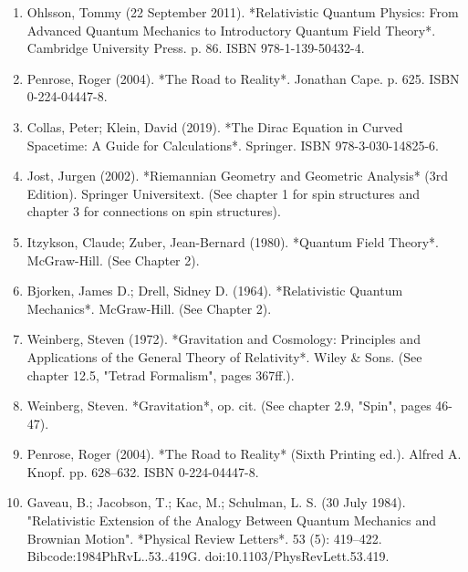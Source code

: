 \begin{enumerate}
\item Ohlsson, Tommy (22 September 2011). *Relativistic Quantum Physics: From Advanced Quantum Mechanics to Introductory Quantum Field Theory*. Cambridge University Press. p. 86. ISBN 978-1-139-50432-4.
\item Penrose, Roger (2004). *The Road to Reality*. Jonathan Cape. p. 625. ISBN 0-224-04447-8.
\item Collas, Peter; Klein, David (2019). *The Dirac Equation in Curved Spacetime: A Guide for Calculations*. Springer. ISBN 978-3-030-14825-6.
\item Jost, Jurgen (2002). *Riemannian Geometry and Geometric Analysis* (3rd Edition). Springer Universitext. (See chapter 1 for spin structures and chapter 3 for connections on spin structures).
\item Itzykson, Claude; Zuber, Jean-Bernard (1980). *Quantum Field Theory*. McGraw-Hill. (See Chapter 2).
\item Bjorken, James D.; Drell, Sidney D. (1964). *Relativistic Quantum Mechanics*. McGraw-Hill. (See Chapter 2).
\item Weinberg, Steven (1972). *Gravitation and Cosmology: Principles and Applications of the General Theory of Relativity*. Wiley & Sons. (See chapter 12.5, "Tetrad Formalism", pages 367ff.).
\item Weinberg, Steven. *Gravitation*, op. cit. (See chapter 2.9, "Spin", pages 46-47).
\item Penrose, Roger (2004). *The Road to Reality* (Sixth Printing ed.). Alfred A. Knopf. pp. 628–632. ISBN 0-224-04447-8.
\item Gaveau, B.; Jacobson, T.; Kac, M.; Schulman, L. S. (30 July 1984). "Relativistic Extension of the Analogy Between Quantum Mechanics and Brownian Motion". *Physical Review Letters*. 53 (5): 419–422. Bibcode:1984PhRvL..53..419G. doi:10.1103/PhysRevLett.53.419.
\end{enumerate}




























